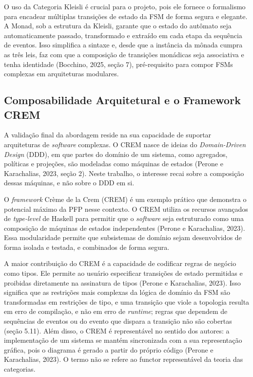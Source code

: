 \documentclass[12pt,a4paper]{article}
\begin{document}
O uso da Categoria Kleisli é crucial para o projeto, pois ele fornece o formalismo para encadear múltiplas transições de estado da FSM de forma segura e elegante. A Monad, sob a estrutura da Kleisli, garante que o estado do autômato seja automaticamente passado, transformado e extraído em cada etapa da sequência de eventos. Isso simplifica a sintaxe e, desde que a instância da mônada cumpra as três leis, faz com que a composição de transições monádicas seja associativa e tenha identidade (Bocchino, 2025, seção 7), pré-requisito para compor FSMs complexas em arquiteturas modulares.

\subsection{Composabilidade Arquitetural e o Framework CREM}

A validação final da abordagem reside na sua capacidade de suportar arquiteturas de \textit{software} complexas. O CREM nasce de ideias do \textit{Domain-Driven Design} (DDD), em que partes do domínio de um sistema, como agregados, políticas e projeções, são modeladas como máquinas de estados (Perone e Karachalias, 2023, seção 2). Neste trabalho, o interesse recai sobre a composição dessas máquinas, e não sobre o DDD em si.

O \textit{framework} Crème de la Crem (CREM) é um exemplo prático que demonstra o potencial máximo da PFP nesse contexto. O CREM utiliza os recursos avançados de \textit{type-level} de Haskell para permitir que o \textit{software} seja estruturado como uma composição de máquinas de estados independentes (Perone e Karachalias, 2023). Essa modularidade permite que subsistemas de domínio sejam desenvolvidos de forma isolada e testada, e combinados de forma segura.

A maior contribuição do CREM é a capacidade de codificar regras de negócio como tipos. Ele permite ao usuário especificar transições de estado permitidas e proibidas diretamente na assinatura de tipos (Perone e Karachalias, 2023). Isso significa que as restrições mais complexas da lógica de domínio da FSM são transformadas em restrições de tipo, e uma transição que viole a topologia resulta em erro de compilação, e não em erro de \textit{runtime}; regras que dependem de sequências de eventos ou do evento que dispara a transição não são cobertas (seção 5.11). Além disso, o CREM é representável no sentido dos autores: a implementação de um sistema se mantém sincronizada com a sua representação gráfica, pois o diagrama é gerado a partir do próprio código (Perone e Karachalias, 2023). O termo não se refere ao functor representável da teoria das categorias.
\end{document}

